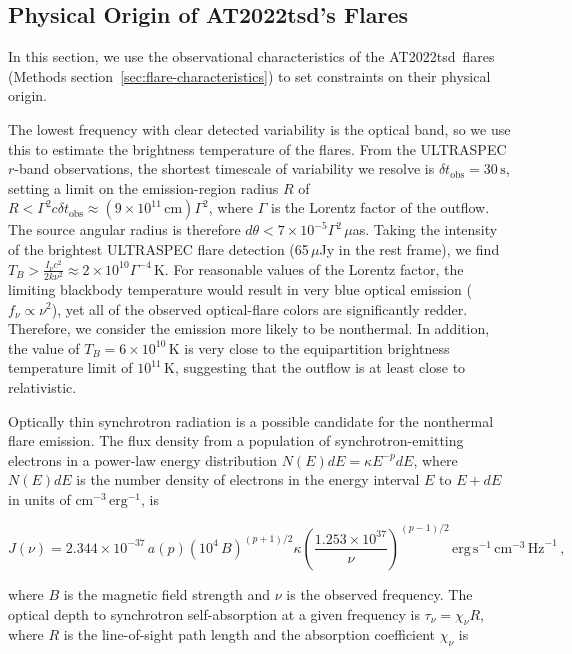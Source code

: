 \documentclass{nature_plusfigure}
\newcommand{\at}{AT2022tsd}
\begin{document}
\begin{methods}
\section{Physical Origin of \at's Flares}
\label{sec:flare-origin}

In this section, we use the observational characteristics of the \at\ flares (Methods section~\ref{sec:flare-characteristics}) to set constraints on their physical origin.

The lowest frequency with clear detected variability is the optical band, so we use this to estimate the brightness temperature of the flares.
From the ULTRASPEC $r$-band observations, the shortest timescale of variability we resolve is $\delta t_\mathrm{obs} = 30\,\mathrm{s}$, setting a limit on the emission-region radius $R$ of $R<\Gamma^2 c \delta t_\mathrm{obs} \approx (9\times10^{11}\,\mathrm{cm}) \Gamma^2$, where $\Gamma$ is the Lorentz factor of the outflow. 
The source angular radius is therefore $d\theta < 7 \times 10^{-5} \Gamma^2 \,\mu$as. Taking the intensity of the brightest ULTRASPEC flare detection (65\,$\mu$Jy in the rest frame), we find $T_B > \frac{I_\nu c^2}{2 k\nu^2} \approx 2\times10^{10} \Gamma^{-4} \,$K.
For reasonable values of the Lorentz factor,
the limiting blackbody temperature would result in very blue optical emission ($f_\nu\propto\nu^2$), yet all of the observed optical-flare colors are significantly redder.
Therefore, we consider the emission more likely to be nonthermal.
In addition, the value of $T_B=6\times10^{10}\,$K is very close to the equipartition brightness temperature limit\cite{Readhead1994} of $10^{11}$\,K, suggesting that the outflow is at least close to relativistic. 

Optically thin synchrotron radiation is a possible candidate for the nonthermal flare emission. The flux density from a population of synchrotron-emitting electrons in a power-law energy distribution $N(E)dE = \kappa E^{-p} dE$, where $N(E)dE$ is the number density of electrons in the energy interval $E$ to $E+dE$ in units of $\mathrm{cm}^{-3}\,\mathrm{erg}^{-1}$, is\cite{Longair2011}

\begin{equation}
\label{eq:synchrotron-flux}
    J(\nu) = 2.344\times10^{-37}\, a(p) (10^4\,B)^{(p+1)/2} \kappa \left( \frac{1.253\times10^{37}}{\nu} \right)^{(p-1)/2}\,\mathrm{erg}\,\mathrm{s}^{-1}\,\mathrm{cm}^{-3}\,\mathrm{Hz}^{-1}\,,
\end{equation}

\noindent where $B$ is the magnetic field strength and $\nu$ is the observed frequency. The optical depth to synchrotron self-absorption at a given frequency is $\tau_\nu = \chi_\nu R$, where $R$ is the line-of-sight path length and the absorption coefficient $\chi_\nu$ is


\end{methods}
\end{document}
